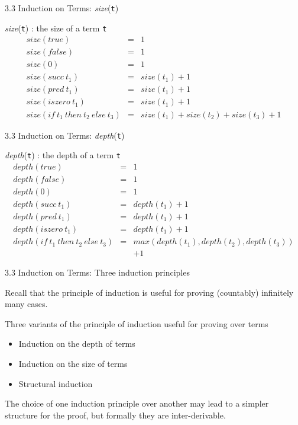 \documentclass[table]{beamer}
\begin{document}
\begin{frame}[t]{3.3 Induction on Terms: \textit{size}(\texttt{t})} \vspace{10pt}

\textit{size}(\texttt{t}) : the size of a term \texttt{t}
\begin{eqnarray*}
size(true) &=& 1 \\
size(false) &=& 1 \\
size(0) &=& 1 \\
size(succ \ t_1) &=& size(t_1)+1 \\
size(pred \ t_1) &=& size(t_1)+1 \\
size(iszero \ t_1) &=& size(t_1)+1 \\
size(if \ t_1 \ then \  t_2 \ else  \ t_3) &=& size(t_1)+ size(t_2)+ size(t_3)+1
\end{eqnarray*}

\end{frame}

\begin{frame}[t]{3.3 Induction on Terms: \textit{depth}(\texttt{t}) } \vspace{10pt}

\textit{depth}(\texttt{t}) : the depth of a term \texttt{t}
\begin{eqnarray*}
depth(true) &=& 1 \\
depth(false) &=& 1 \\
depth(0) &=& 1 \\
depth(succ \ t_1) &=& depth(t_1)+1 \\
depth(pred \ t_1) &=& depth(t_1)+1 \\
depth(iszero \ t_1) &=& depth(t_1)+1 \\
depth(if \ t_1 \ then \ t_2 \ else  \ t_3) &=& max(depth(t_1),depth(t_2),depth(t_3)) \\ 
& & +1
\end{eqnarray*}

\end{frame}


\begin{frame}[t]{3.3 Induction on Terms: Three induction principles} 

Recall that the principle of induction is useful for proving (countably) infinitely many cases.

\vspace{10pt}

Three variants of the principle of induction useful for proving over terms
\begin{itemize}
\item Induction on the depth of terms
\item Induction on the size of terms
\item Structural induction 
\end{itemize}

\vspace{10pt}

The choice of one induction principle over another may lead to a simpler structure for the proof, but formally they are inter-derivable. 

\end{frame}
\end{document}
